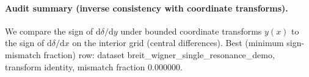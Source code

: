 \paragraph{Audit summary (inverse consistency with coordinate transforms).} \AuditTag We compare the sign of $\mathrm{d}\delta/\mathrm{d}y$ under bounded coordinate transforms $y(x)$ to the sign of $\mathrm{d}\delta/\mathrm{d}x$ on the interior grid (central differences). Best (minimum sign-mismatch fraction) row: dataset breit\_wigner\_single\_resonance\_demo, transform identity, mismatch fraction 0.000000.